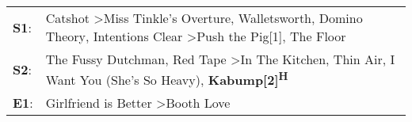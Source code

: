 \begin{supertabular}{p{0.03\textwidth}p{0.92\textwidth}}
 \textbf{S1}:  &  Catshot\textsuperscript{} \textgreater \enspace Miss Tinkle's Overture\textsuperscript{}, \enspace Walletsworth\textsuperscript{}, \enspace Domino Theory\textsuperscript{}, \enspace Intentions Clear\textsuperscript{} \textgreater \enspace Push the Pig[1]\textsuperscript{}, \enspace The Floor\textsuperscript{}  \enspace  \\
 \textbf{S2}:  &                                           The Fussy Dutchman\textsuperscript{}, \enspace Red Tape\textsuperscript{} \textgreater \enspace In The Kitchen\textsuperscript{}, \enspace Thin Air\textsuperscript{}, \enspace I Want You (She's So Heavy)\textsuperscript{}, \enspace \textbf{Kabump[2]\textsuperscript{H}}  \enspace  \\
 \textbf{E1}:  &                                                                                                                                                                                                                               Girlfriend is Better\textsuperscript{} \textgreater \enspace Booth Love\textsuperscript{}  \enspace  \\
\end{supertabular}
